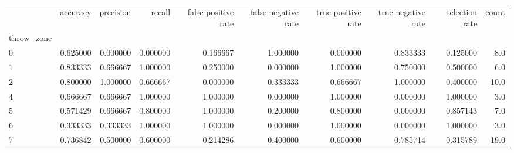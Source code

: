 \begin{tabular}{lrrrrrrrrr}
\toprule
{} &  accuracy &  precision &    recall &  false positive rate &  false negative rate &  true positive rate &  true negative rate &  selection rate &  count \\
throw\_zone &           &            &           &                      &                      &                     &                     &                 &        \\
\midrule
0          &  0.625000 &   0.000000 &  0.000000 &             0.166667 &             1.000000 &            0.000000 &            0.833333 &        0.125000 &    8.0 \\
1          &  0.833333 &   0.666667 &  1.000000 &             0.250000 &             0.000000 &            1.000000 &            0.750000 &        0.500000 &    6.0 \\
2          &  0.800000 &   1.000000 &  0.666667 &             0.000000 &             0.333333 &            0.666667 &            1.000000 &        0.400000 &   10.0 \\
4          &  0.666667 &   0.666667 &  1.000000 &             1.000000 &             0.000000 &            1.000000 &            0.000000 &        1.000000 &    3.0 \\
5          &  0.571429 &   0.666667 &  0.800000 &             1.000000 &             0.200000 &            0.800000 &            0.000000 &        0.857143 &    7.0 \\
6          &  0.333333 &   0.333333 &  1.000000 &             1.000000 &             0.000000 &            1.000000 &            0.000000 &        1.000000 &    3.0 \\
7          &  0.736842 &   0.500000 &  0.600000 &             0.214286 &             0.400000 &            0.600000 &            0.785714 &        0.315789 &   19.0 \\
\bottomrule
\end{tabular}
